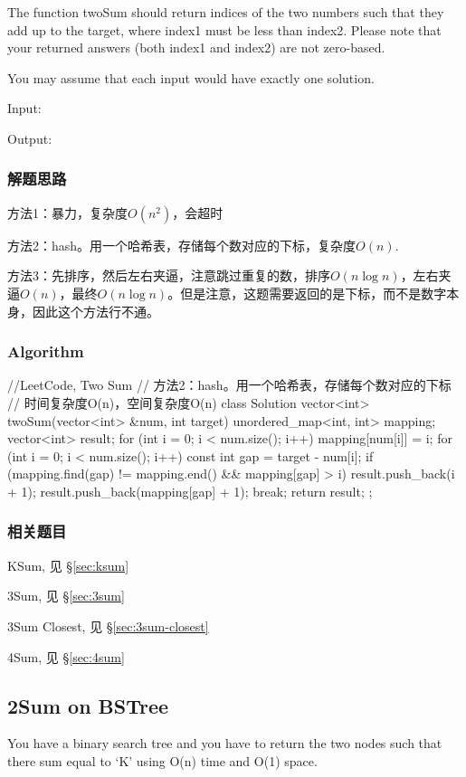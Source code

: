 The function twoSum should return indices of the two numbers such that they add 
up to the target, where index1 must be less than index2. Please note that your 
returned answers (both index1 and index2) are not zero-based.

You may assume that each input would have exactly one solution.

Input:  

Output: 


\subsubsection{解题思路}
方法1：暴力，复杂度$O(n^2)$，会超时

方法2：hash。用一个哈希表，存储每个数对应的下标，复杂度$O(n)$.

方法3：先排序，然后左右夹逼，注意跳过重复的数，排序$O(n\log n)$，左右夹逼$O(n)$，最终$O(n\log 
n)$。但是注意，这题需要返回的是下标，而不是数字本身，因此这个方法行不通。


\subsubsection{Algorithm}
\begin{Code}
	//LeetCode, Two Sum
	// 方法2：hash。用一个哈希表，存储每个数对应的下标
	// 时间复杂度O(n)，空间复杂度O(n)
	class Solution {
		vector<int> twoSum(vector<int> &num, int target) {
			unordered_map<int, int> mapping;
			vector<int> result;
			for (int i = 0; i < num.size(); i++) 
				mapping[num[i]] = i;
			for (int i = 0; i < num.size(); i++) {
				const int gap = target - num[i];
				if (mapping.find(gap) != mapping.end() && mapping[gap] > i) {
					result.push_back(i + 1);
					result.push_back(mapping[gap] + 1);
					break;
				}
			}
			return result;
		}
	};
\end{Code}


\subsubsection{相关题目}
\begindot
\item KSum, 见 \S \ref{sec:ksum}
\item 3Sum, 见 \S \ref{sec:3sum}
\item 3Sum Closest, 见 \S \ref{sec:3sum-closest}
\item 4Sum, 见 \S \ref{sec:4sum}
\myenddot

\subsection{2Sum on BSTree}
You have a binary search tree and you have to return the two nodes such that there sum equal to ‘K’ using O(n) time and O(1) space.

